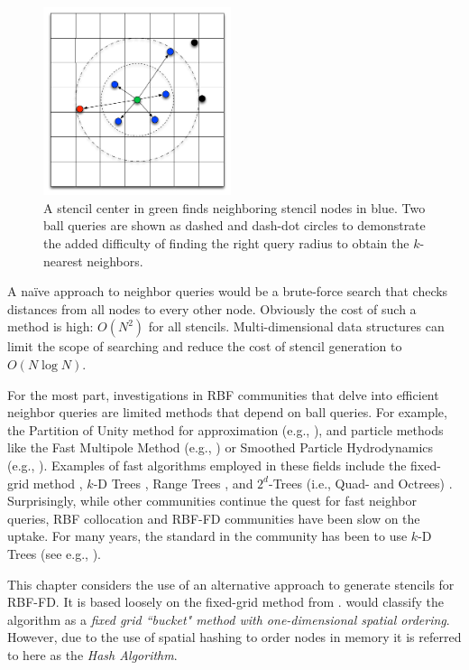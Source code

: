 \documentclass{report}
\begin{document}
\begin{figure}
\centering
\includegraphics[width=5.5cm]{rbffd_methods_content/neighbors/ball_query_vs_kNN.png}
\caption{A stencil center in green finds neighboring stencil nodes in blue. Two ball queries are shown as dashed and dash-dot circles to demonstrate the added difficulty of finding the right query radius to obtain the $k$-nearest neighbors.}
\label{fig:nearest_neighbor_example}
\end{figure}


A na\"{i}ve approach to neighbor queries would be a brute-force search that checks distances from all nodes to every other node. Obviously the cost of such a method is high: $O(N^2)$ for all stencils. Multi-dimensional data structures can limit the scope of searching and reduce the cost of stencil generation to $O(N \log{N})$. 

For the most part, investigations in RBF communities that delve into efficient neighbor queries are limited methods that depend on ball queries. For example, the Partition of Unity method for approximation (e.g., \cite{Wendland2002,WendlandBook}), and particle methods like the Fast Multipole Method (e.g., \cite{Ying2006, Gumerov2003}) or Smoothed Particle Hydrodynamics (e.g., \cite{Krog2010}). Examples of fast algorithms employed in these fields include the fixed-grid method \cite{WendlandBook,Krog2010}, $k$-D Trees \cite{WendlandBook}, Range Trees \cite{Wendland2002,WendlandBook}, and $2^d$-Trees (i.e., Quad- and Octrees) \cite{Gumerov2003, Ying2006}. Surprisingly, while other communities continue the quest for fast neighbor queries, RBF collocation and RBF-FD communities have been slow on the uptake. For many years, the standard in the community has been to use $k$-D Trees (see e.g., \cite{Fasshauer2007, FlyerLehto11,FornbergLehto11}). 


This chapter considers the use of an alternative approach to generate stencils for RBF-FD. It is based loosely on the fixed-grid method from \cite{Krog2010}. \cite{Samet2005} would classify the algorithm as a \emph{fixed grid ``bucket" method with one-dimensional spatial ordering}. However, due to the use of spatial hashing to order nodes in memory it is referred to here as the \emph{Hash Algorithm}. 
\end{document}
